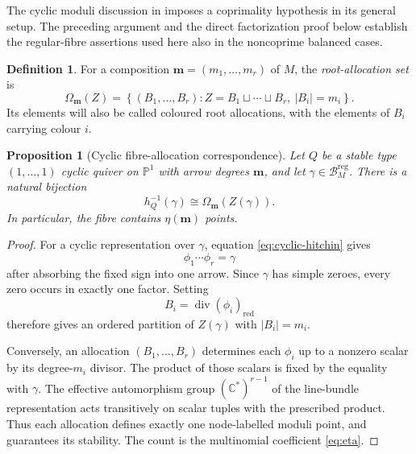 \documentclass[11pt]{article}
\newtheorem{proposition}[theorem]{Proposition}
\theoremstyle{definition}
\newtheorem{definition}[theorem]{Definition}
\theoremstyle{remark}
\newcommand{\C}{\mathbb C}
\newcommand{\Pp}{\mathbb P}
\newcommand{\cB}{\mathcal B}
\newcommand{\reg}{\mathrm{reg}}
\begin{document}
The cyclic moduli discussion in \cite{RayanSundboCyclic2021} imposes a coprimality hypothesis in its general setup.  The preceding argument and the direct factorization proof below establish the regular-fibre assertions used here also in the noncoprime balanced cases.

\begin{definition}\label{def:allocation-set}
For a composition $\boldsymbol m=(m_1,\ldots,m_r)$ of $M$, the \emph{root-allocation set} is
\begin{equation}\label{eq:allocation-set}
 \Omega_{\boldsymbol m}(Z)
 =\left\{(B_1,\ldots,B_r):
 Z=B_1\sqcup\cdots\sqcup B_r,\ |B_i|=m_i\right\}.
\end{equation}
Its elements will also be called coloured root allocations, with the elements of $B_i$ carrying colour $i$.
\end{definition}

\begin{proposition}[Cyclic fibre-allocation correspondence]\label{prop:fibre-allocation}
Let $Q$ be a stable type $(1,\ldots,1)$ cyclic quiver on $\Pp^1$ with arrow degrees $\boldsymbol m$, and let $\gamma\in\cB_M^{\reg}$.  There is a natural bijection
\begin{equation}\label{eq:fibre-allocation-bijection}
 h_Q^{-1}(\gamma)\cong\Omega_{\boldsymbol m}(Z(\gamma)).
\end{equation}
In particular, the fibre contains $\eta(\boldsymbol m)$ points.
\end{proposition}

\begin{proof}
For a cyclic representation over $\gamma$, equation \eqref{eq:cyclic-hitchin} gives
\[
  \phi_1\cdots\phi_r=\gamma
\]
after absorbing the fixed sign into one arrow.  Since $\gamma$ has simple zeroes, every zero occurs in exactly one factor.  Setting
\[
  B_i=\operatorname{div}(\phi_i)_{\mathrm{red}}
\]
therefore gives an ordered partition of $Z(\gamma)$ with $|B_i|=m_i$.

Conversely, an allocation $(B_1,\ldots,B_r)$ determines each $\phi_i$ up to a nonzero scalar by its degree-$m_i$ divisor.  The product of those scalars is fixed by the equality with $\gamma$.  The effective automorphism group $(\C^*)^{r-1}$ of the line-bundle representation acts transitively on scalar tuples with the prescribed product.  Thus each allocation defines exactly one node-labelled moduli point, and  guarantees its stability.  The count is the multinomial coefficient \eqref{eq:eta}.
\end{proof}
\end{document}
